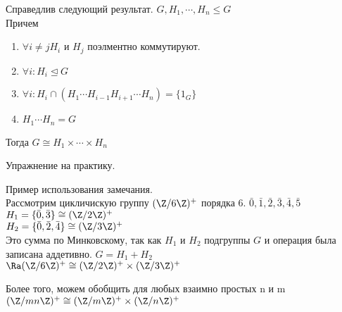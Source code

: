 \begin{Rem}
Справедлив следующий результат. 
$G, H_1, \cdots, H_n \le G$\\
Причем   
\begin{enumerate}
\item $\forall i \ne j H_i$ и $H_j$ поэлментно коммутируют. 
\item $\forall i \colon H_i \unlhd G$\\
\item $\forall i \colon H_i \cap (H_1 \cdots H_{i - 1}H_{i + 1} \cdots H_n) = \{1_G\}$\\
\item $H_1 \cdots H_n = G$\\
\end{enumerate}
Тогда $G \cong H_1 \times \cdots \times H_n$

Упражнение на практику. 
\end{Rem}

\begin{exmp}
Пример использования замечания.\\
Рассмотрим цикличискую группу $(\Z / 6 \Z)^{+}$  порядка 6.
${\bar 0, \bar 1, \bar 2, \bar 3, \bar 4, \bar 5}$\\
$H_1 = \{\bar 0, \bar 3\} \cong (\Z/2\Z)^{+}$\\
$H_2 = \{\bar 0, \bar 2, \bar 4\} \cong (\Z/3\Z)^{+}$\\
Это сумма по Минковскому, так как $H_1$ и $H_2$ подгруппы $G$ и операция была записана аддетивно. 
$G = H_1 + H_2$ \\
$\Ra (\Z / 6\Z)^{+} \cong (\Z/2\Z)^{+} \times (\Z/3\Z)^{+}$

Более того, можем обобщить для любых взаимно простых n и m\\
$(\Z/mn\Z)^{+} \cong (\Z/m\Z)^{+} \times (\Z/n\Z)^{+}$
\end{exmp}

